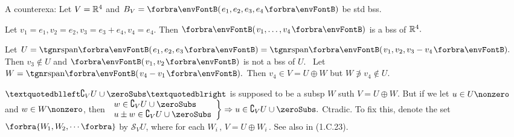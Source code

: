 \vspace{8pt}

A counterexa\hspace{1pt}: Let $V={\mathbb{R}}^4$ and $B_V=\Par{e_1,e_2,e_3,e_4}$ be std bss.\par\quad
Let $v_1=e_1,v_2=e_2,v_3=e_3+e_4,v_4=e_4.$ Then $\Par{v_1,\dots,v_4}$ is a bss of ${\mathbb{R}}^4.$\par\quad
Let $U=\Span{e_1,e_2,e_3}=\Span{v_1,v_2,v_3-v_4}.$ Then $v_3\not\in U$ and $\Par{v_1,v_2}$ is not a bss of $U.$\PfEnd\quad
\Comment \,\,\,Let $W=\Span{v_4-v_1}.$ Then $v_4\in V=U\oplus W$ but $W\not\ni v_4\not\in U.$
\SepLine

\BulletPointX{}\;\;$“\complement_V U \cup \zeroSubs”$ is supposed to be a subsp $W$ suth $V=U\oplus W$.\TextB{\vspace{4pt}}
But if we let $u\in U\nonzero$ and $w\in W\nonzero$, then $\MathRightBrace{l}{w\in\complement_V U \cup \zeroSubs\\ u\pm w\in\complement_V U \cup \zeroSubs }\Rightarrow u\in\complement_V U \cup \zeroSubs.$ Ctradic.\vspace{4pt}\TextB{}
To fix this, {\FontLarge denote the set $\Bra{W_{\hspace{-1pt}1},W_{\hspace{-1pt}2},\cdots}$ by $\mathcal{S}_{\!V} U$,} {\small where for each $W_{\!i}\,,\,V=U\oplus W_{\!i}$\,.} {\normalsize See also in (1.C.23).}\par\SepLine

